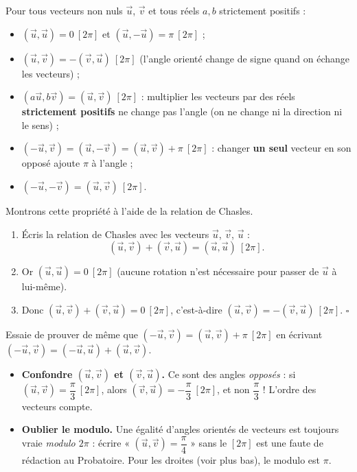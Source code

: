 \documentclass[11pt]{article}
\begin{document}
\begin{propriete}
Pour tous vecteurs non nuls $\vec{u}$, $\vec{v}$ et tous réels $a, b$ strictement positifs :
\begin{itemize}
  \item $(\vec{u}, \vec{u}) = 0 \ [2\pi]$ et $(\vec{u}, -\vec{u}) = \pi \ [2\pi]$ ;
  \item $(\vec{u}, \vec{v}) = -(\vec{v}, \vec{u}) \ [2\pi]$ \quad (l'angle orienté change de signe quand on échange les vecteurs) ;
  \item $(a\vec{u}, b\vec{v}) = (\vec{u}, \vec{v}) \ [2\pi]$ : multiplier les vecteurs par des réels \textbf{strictement positifs} ne change pas l'angle (on ne change ni la direction ni le sens) ;
  \item $(-\vec{u}, \vec{v}) = (\vec{u}, -\vec{v}) = (\vec{u}, \vec{v}) + \pi \ [2\pi]$ : changer \textbf{un seul} vecteur en son opposé ajoute $\pi$ à l'angle ;
  \item $(-\vec{u}, -\vec{v}) = (\vec{u}, \vec{v}) \ [2\pi]$.
\end{itemize}
\end{propriete}

\begin{experience}[Démonstration guidée : $(\vec{u}, \vec{v}) = -(\vec{v}, \vec{u})$]
Montrons cette propriété à l'aide de la relation de Chasles.
\begin{enumerate}
  \item Écris la relation de Chasles avec les vecteurs $\vec{u}$, $\vec{v}$, $\vec{u}$ :
  \[ (\vec{u}, \vec{v}) + (\vec{v}, \vec{u}) = (\vec{u}, \vec{u}) \ [2\pi]. \]
  \item Or $(\vec{u}, \vec{u}) = 0 \ [2\pi]$ (aucune rotation n'est nécessaire pour passer de $\vec{u}$ à lui-même).
  \item Donc $(\vec{u}, \vec{v}) + (\vec{v}, \vec{u}) = 0 \ [2\pi]$, c'est-à-dire $(\vec{u}, \vec{v}) = -(\vec{v}, \vec{u}) \ [2\pi]$. \hfill $\square$
\end{enumerate}
Essaie de prouver de même que $(-\vec{u}, \vec{v}) = (\vec{u}, \vec{v}) + \pi \ [2\pi]$ en écrivant $(-\vec{u}, \vec{v}) = (-\vec{u}, \vec{u}) + (\vec{u}, \vec{v})$.
\end{experience}

\begin{attention}
\begin{itemize}
  \item \textbf{Confondre $(\vec{u}, \vec{v})$ et $(\vec{v}, \vec{u})$.} Ce sont des angles \emph{opposés} : si $(\vec{u}, \vec{v}) = \dfrac{\pi}{3} \ [2\pi]$, alors $(\vec{v}, \vec{u}) = -\dfrac{\pi}{3} \ [2\pi]$, et non $\dfrac{\pi}{3}$ ! L'ordre des vecteurs compte.
  \item \textbf{Oublier le modulo.} Une égalité d'angles orientés de vecteurs est toujours vraie \emph{modulo $2\pi$} : écrire « $(\vec{u}, \vec{v}) = \dfrac{\pi}{4}$ » sans le $[2\pi]$ est une faute de rédaction au Probatoire. Pour les droites (voir plus bas), le modulo est $\pi$.
\end{itemize}
\end{attention}
\end{document}
